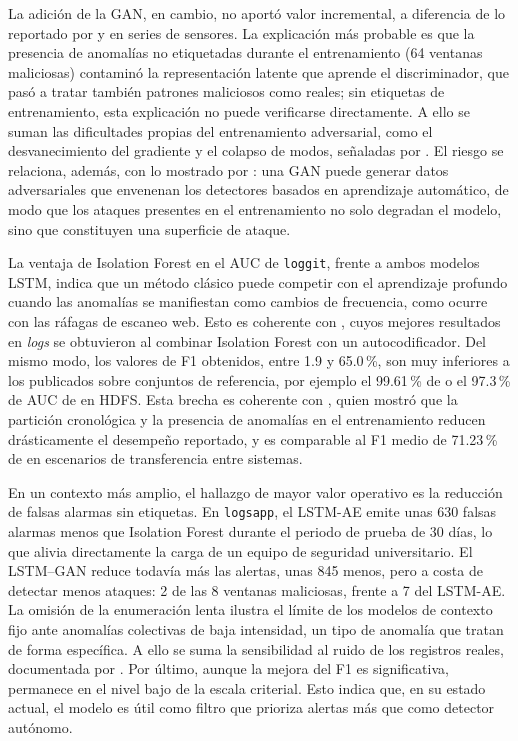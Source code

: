 \documentclass[jou,a4paper,floatsintext,donotrepeattitle]{apa7}
\begin{document}
La adición de la GAN, en cambio, no aportó valor incremental, a diferencia de lo reportado por \textcite{niu2020} y \textcite{qian2025} en series de sensores. La explicación más probable es que la presencia de anomalías no etiquetadas durante el entrenamiento (64 ventanas maliciosas) contaminó la representación latente que aprende el discriminador, que pasó a tratar también patrones maliciosos como reales; sin etiquetas de entrenamiento, esta explicación no puede verificarse directamente. A ello se suman las dificultades propias del entrenamiento adversarial, como el desvanecimiento del gradiente y el colapso de modos, señaladas por \textcite{qian2025}. El riesgo se relaciona, además, con lo mostrado por \textcite{liu2023}: una GAN puede generar datos adversariales que envenenan los detectores basados en aprendizaje automático, de modo que los ataques presentes en el entrenamiento no solo degradan el modelo, sino que constituyen una superficie de ataque.

La ventaja de Isolation Forest en el AUC de \texttt{loggit}, frente a ambos modelos LSTM, indica que un método clásico puede competir con el aprendizaje profundo cuando las anomalías se manifiestan como cambios de frecuencia, como ocurre con las ráfagas de escaneo web. Esto es coherente con \textcite{farzad2020}, cuyos mejores resultados en \textit{logs} se obtuvieron al combinar Isolation Forest con un autocodificador. Del mismo modo, los valores de F1 obtenidos, entre 1.9 y 65.0\,\%, son muy inferiores a los publicados sobre conjuntos de referencia, por ejemplo el 99.61\,\% de \textcite{nasirzadeh2025} o el 97.3\,\% de AUC de \textcite{gorokhov2023} en HDFS. Esta brecha es coherente con \textcite{albert2025}, quien mostró que la partición cronológica y la presencia de anomalías en el entrenamiento reducen drásticamente el desempeño reportado, y es comparable al F1 medio de 71.23\,\% de \textcite{zhao2025} en escenarios de transferencia entre sistemas.

En un contexto más amplio, el hallazgo de mayor valor operativo es la reducción de falsas alarmas sin etiquetas. En \texttt{logsapp}, el LSTM-AE emite unas 630 falsas alarmas menos que Isolation Forest durante el periodo de prueba de 30 días, lo que alivia directamente la carga de un equipo de seguridad universitario. El LSTM--GAN reduce todavía más las alertas, unas 845 menos, pero a costa de detectar menos ataques: 2 de las 8 ventanas maliciosas, frente a 7 del LSTM-AE. La omisión de la enumeración lenta ilustra el límite de los modelos de contexto fijo ante anomalías colectivas de baja intensidad, un tipo de anomalía que \textcite{nasirzadeh2025} tratan de forma específica. A ello se suma la sensibilidad al ruido de los registros reales, documentada por \textcite{zhang2025}. Por último, aunque la mejora del F1 es significativa, permanece en el nivel bajo de la escala criterial. Esto indica que, en su estado actual, el modelo es útil como filtro que prioriza alertas más que como detector autónomo.
\end{document}
